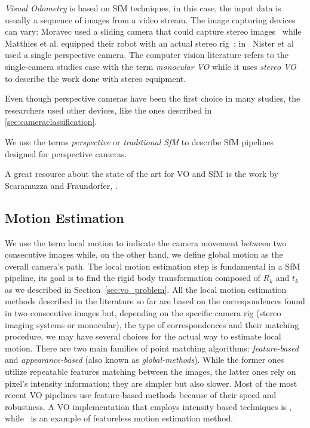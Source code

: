 \textit{Visual Odometry} is based on SfM techniques, 
in this case, the input data is usually a sequence 
of images from a video stream. The image capturing devices can vary:
Moravec used a sliding camera that could capture stereo images~\cite{moravec1980obstacle} while Matthies et al. equipped their robot with
an actual stereo rig~\cite{matthies1987error};
in~\cite{nister2004visual} Nister et al used a single perspective camera.
The computer vision literature refers to the
single-camera studies case with the term \textit{monocular VO} while it uses \textit{stereo VO} to describe the work done with stereo equipment.

Even though perspective cameras have been the first choice in many studies, 
the researchers used other devices, like the ones described in 
\ref{sec:cameraclassification}.

We use the terms \textit{perspective} or \textit{traditional SfM} to describe 
SfM pipelines designed for perspective cameras.

A great resource about the state of the art for VO and SfM is the work by Scaramuzza and Fraundorfer,  
\cite{scaramuzzaVisualOdometryI, scaramuzzaVisualOdometryII}.

\subsection{Motion Estimation}
\label{subsec:motion_estimation}
We use the term local motion to indicate the camera movement between two 
consecutive images while, on the other hand, we define global motion as
the overall camera's path.
The local motion estimation step is fundamental in a SfM pipeline, its goal is 
to find the rigid body transformation composed of $R_k$ and $t_k$ as we 
described in Section~\ref{sec:vo_problem}.
All the local motion estimation methods described in the literature so far are 
based on the correspondences found in two consecutive images but, depending on the
specific camera rig (stereo imaging systems or monocular), the type of 
correspondences and their matching procedure, we may have several choices for
the actual way to estimate local motion.
There are two main families of point matching algorithms: \textit{feature-based}
and \textit{appearance-based} (also known as \textit{global-methods}).
While the former ones utilize repeatable features 
matching between the images, the latter ones rely on pixel's intensity information; 
they are simpler but also slower. Most of the 
most recent VO pipelines use feature-based methods because of
their speed and robustness.
A VO implementation that employs intensity based techniques is 
\cite{nister2004visual}, while~\cite{makadia2007correspondence} is an example 
of featureless motion estimation method.

